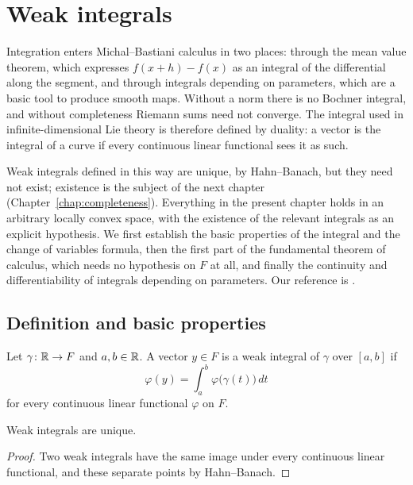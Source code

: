 \chapter{Weak integrals}
\label{chap:integrals}

Integration enters Michal--Bastiani calculus in two places: through the mean value theorem,
which expresses $f(x + h) - f(x)$ as an integral of the differential along the segment, and
through integrals depending on parameters, which are a basic tool to produce smooth maps.
Without a norm there is no Bochner integral, and without completeness Riemann
sums need not converge. The integral used in infinite-dimensional Lie theory is therefore
defined by duality: a vector is the integral of a curve if every continuous linear functional
sees it as such.

Weak integrals defined in this way are unique, by Hahn--Banach, but they need not exist;
existence is the subject of the next chapter (Chapter~\ref{chap:completeness}).
Everything in the present chapter holds in an arbitrary
locally convex space, with the existence of the relevant integrals as an explicit hypothesis.
We first establish the basic properties of the integral and the change of variables formula,
then the first part of the fundamental theorem of calculus, which needs no hypothesis on $F$
at all, and finally the continuity and differentiability of integrals depending on parameters.
Our reference is \cite[\S1.1]{GN26}.

\section{Definition and basic properties}

\begin{definition}
  \label{def:weak-integral}
  \leanok
  Let $\gamma \colon \mathbb{R} \to F$ and $a, b \in \mathbb{R}$. A vector $y \in F$ is a weak integral of
  $\gamma$ over $[a, b]$ if
  \[
    \varphi(y) = \int_a^b \varphi\bigl(\gamma(t)\bigr)\, dt
  \]
  for every continuous linear functional $\varphi$ on $F$.
\end{definition}

\begin{lemma}[Uniqueness]
  \label{lem:weak-integral-unique}
  \leanok
  Weak integrals are unique.
\end{lemma}

\begin{proof}
  \leanok
  Two weak integrals have the same image under every continuous linear functional, and these
  separate points by Hahn--Banach.
\end{proof}

